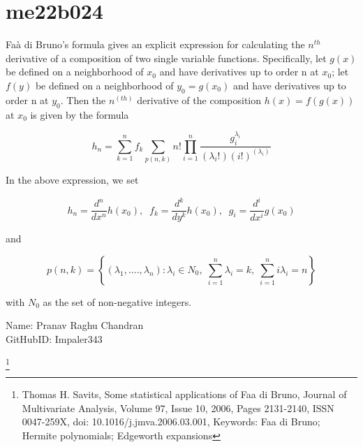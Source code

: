 \section{me22b024}
Faà di Bruno’s formula gives an explicit expression for calculating the  $ n^{th} $  derivative of a composition of two single variable functions. Specifically, let $g(x)$ be defined on a neighborhood
of $x_0$ and have derivatives up to order n at $x_0$; let $f(y)$ be defined on a neighborhood of $y_0 = g(x_0)$
and have derivatives up to order n at $y_0$. Then the $n^(th)$ derivative of the composition $h(x) = f (g(x))$
at $x_0$ is given by the formula

\[
    h_n = \sum_{k=1}^{n} f_k \sum_{p(n,k)} n! \prod_{i=1}^{n} \dfrac{g_i^{\lambda_i}}{(\lambda_i!)(i!)^{(\lambda_i)}}
\]

In the above expression, we set

\[
    h_n = \frac{d^n }{dx^n} h(x_0),\;\; f_k = \frac{d^k }{dy^k} h(x_0),\;\; g_i = \frac{d^i }{dx^i} g(x_0)
\]

and

\[ 
    p(n,k) = \left\{(\lambda_1,....,\lambda_n) : \lambda_i \in N_0,\; \sum_{i=1}^{n} \lambda_i=k,\; \sum_{i=1}^{n} i\lambda_i=n\right\} 
\]

with $N_0$ as the set of non-negative integers.\\

\begin{flushleft}
Name: Pranav Raghu Chandran\\
GitHubID: Impaler343
\end{flushleft}

\footnote{Thomas H. Savits,
Some statistical applications of Faa di Bruno,
Journal of Multivariate Analysis,
Volume 97, Issue 10,
2006,
Pages 2131-2140,
ISSN 0047-259X,
doi: 10.1016/j.jmva.2006.03.001,
Keywords: Faa di Bruno; Hermite polynomials; Edgeworth expansions}
